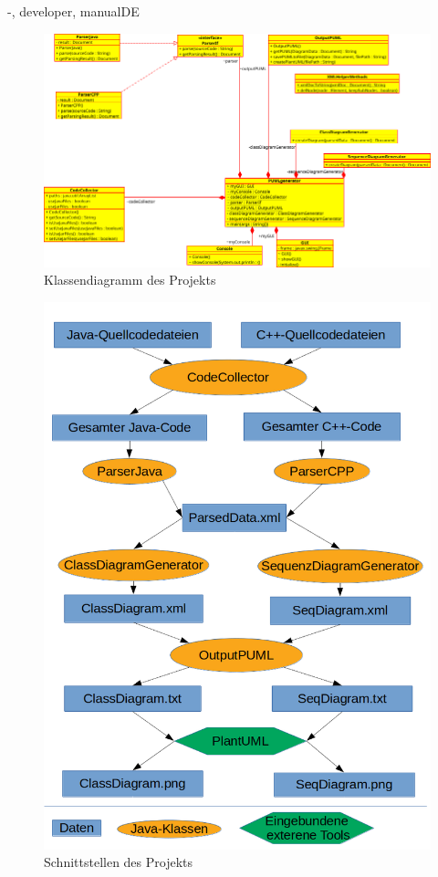 \documentclass[twoside]{report}
\begin{document}
\begin{shownto}{-, developer, manualDE}
\begin{figure}[H]
\centering
\includegraphics[width=\textwidth]{Bilder/classDiagrammFinal.png}
\caption{Klassendiagramm des Projekts}
\end{figure}
\nsecend

\begin{figure}[H]
\centering
\includegraphics[scale=0.6]{Bilder/Schnittstellen.png}
\caption{Schnittstellen des Projekts}
\end{figure}
\nsecend


\end{shownto}
\end{document}
